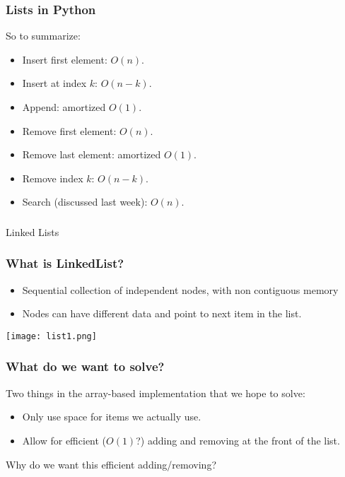 \begin{frame}
	\frametitle{Lists in Python}
	So to summarize:
	\begin{itemize}
		\item Insert first element: $O(n)$.
		\item Insert at index $k$: $O(n-k)$.
		\item Append: amortized $O(1)$.
		\item Remove first element: $O(n)$.
		\item Remove last element: amortized $O(1)$.
		\item Remove index $k$: $O(n-k)$.
		\item Search (discussed last week): $O(n)$.
	\end{itemize}
\end{frame}

\begin{frame}[fragile]\frametitle{}
\begin{center}
{\Large Linked Lists}
\end{center}

\end{frame}

\begin{frame}
	\frametitle{What is LinkedList?}
	
		\begin{itemize}
			\item Sequential collection of independent nodes, with non contiguous memory
			\item Nodes can have different data and point to next item in the list.
		\end{itemize}
	
\begin{center}
\texttt{[image: list1.png]}
\end{center}


\end{frame}

\begin{frame}
	\frametitle{What do we want to solve?}
	
		Two things in the array-based implementation that we hope to solve:
		\begin{itemize}
			\item Only use space for items we actually use.
			\item Allow for efficient ($O(1)$?) adding and removing at the front of the list.
		\end{itemize}
	
		Why do we want this efficient adding/removing?
\end{frame}

